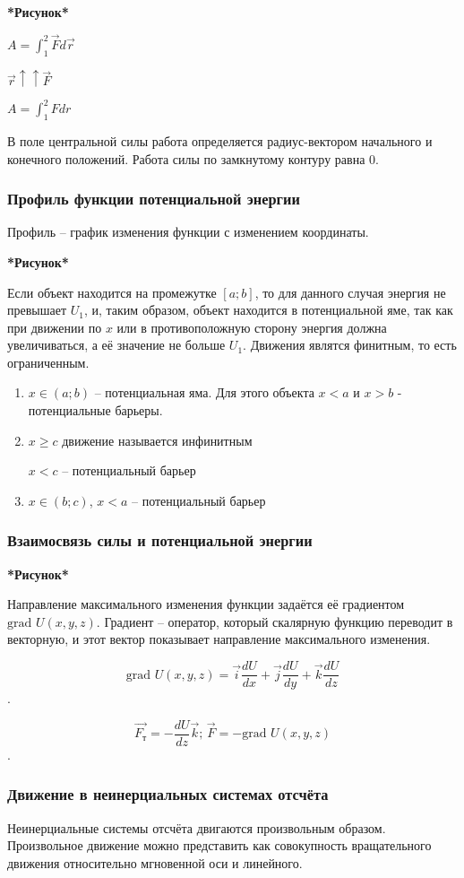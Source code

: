 \documentclass[a4paper,oneside]{article}
\theoremstyle{definition}
\theoremstyle{definition}
\theoremstyle{definition}
\newcommand{\tbf}[1]{\textbf{#1}}
\newcommand{\dsint}{\displaystyle\int}
\begin{document}
\tbf{*Рисунок*}

$A = \dsint_1^2 \vec{F} d \vec{r}$

$\vec{r} \uparrow \uparrow \vec{F}$

$A = \dsint_1^2 Fdr$

В поле центральной силы работа определяется радиус-вектором начального и конечного положений.
Работа силы по замкнутому контуру равна 0.

\subsubsection{Профиль функции потенциальной энергии}
Профиль -- график изменения функции с изменением координаты.

\tbf{*Рисунок*}

Если объект находится на промежутке $[a;b]$, то для данного случая энергия не превышает $U_1$, и, таким образом, объект находится
в потенциальной яме, так как при движении по $x$ или в противоположную сторону энергия должна увеличиваться,
а её значение не больше $U_1$. Движения являтся финитным, то есть ограниченным.

\begin{enumerate}
    \item $x \in (a;b)$ -- потенциальная яма. Для этого объекта $x < a$ и $x > b$ - потенциальные барьеры.
    \item $x \geq c$ движение называется инфинитным

    $x < c$ -- потенциальный барьер
    \item $x \in (b;c)$, $x < a$ -- потенциальный барьер
\end{enumerate}
\subsubsection{Взаимосвязь силы и потенциальной энергии}
\tbf{*Рисунок*}

Направление максимального изменения функции задаётся её градиентом $\text{grad } U(x,y,z)$.
Градиент -- оператор, который скалярную функцию переводит в векторную, и этот вектор показывает направление максимального изменения.

\[\text{grad } U(x,y,z) = \vec{i} \frac{dU}{dx} + \vec{j} \frac{dU}{dy} + \vec{k} \frac{dU}{dz}\].

\[\vec{F_{\text{т}}} = -\frac{dU} {dz} \vec{k} \text{; } \vec{F} = -\text{grad } U(x,y,z)\].

\subsubsection{Движение в неинерциальных системах отсчёта}
Неинерциальные системы отсчёта двигаются произвольным образом. Произвольное движение можно представить как совокупность
вращательного движения относительно мгновенной оси и линейного.
\end{document}
